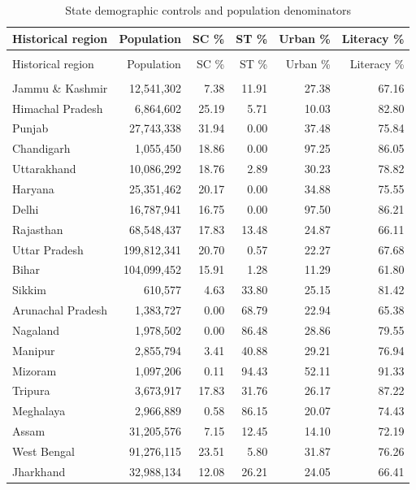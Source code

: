 \documentclass[11pt,a4paper]{report}
\begin{document}
\begin{longtable}{>{\raggedright\arraybackslash}p{5.0cm}rrrrr}
\caption{State demographic controls and population denominators}\\\toprule
Historical region & Population & SC \% & ST \% & Urban \% & Literacy \% \\\midrule\endfirsthead
\multicolumn{6}{l}{\textit{Continued from previous page}}\\\toprule
Historical region & Population & SC \% & ST \% & Urban \% & Literacy \% \\\midrule\endhead
\midrule\multicolumn{6}{r}{\textit{Continued on next page}}\\\endfoot\bottomrule\endlastfoot
Jammu \& Kashmir & 12,541,302 & 7.38 & 11.91 & 27.38 & 67.16 \\
Himachal Pradesh & 6,864,602 & 25.19 & 5.71 & 10.03 & 82.80 \\
Punjab & 27,743,338 & 31.94 & 0.00 & 37.48 & 75.84 \\
Chandigarh & 1,055,450 & 18.86 & 0.00 & 97.25 & 86.05 \\
Uttarakhand & 10,086,292 & 18.76 & 2.89 & 30.23 & 78.82 \\
Haryana & 25,351,462 & 20.17 & 0.00 & 34.88 & 75.55 \\
Delhi & 16,787,941 & 16.75 & 0.00 & 97.50 & 86.21 \\
Rajasthan & 68,548,437 & 17.83 & 13.48 & 24.87 & 66.11 \\
Uttar Pradesh & 199,812,341 & 20.70 & 0.57 & 22.27 & 67.68 \\
Bihar & 104,099,452 & 15.91 & 1.28 & 11.29 & 61.80 \\
Sikkim & 610,577 & 4.63 & 33.80 & 25.15 & 81.42 \\
Arunachal Pradesh & 1,383,727 & 0.00 & 68.79 & 22.94 & 65.38 \\
Nagaland & 1,978,502 & 0.00 & 86.48 & 28.86 & 79.55 \\
Manipur & 2,855,794 & 3.41 & 40.88 & 29.21 & 76.94 \\
Mizoram & 1,097,206 & 0.11 & 94.43 & 52.11 & 91.33 \\
Tripura & 3,673,917 & 17.83 & 31.76 & 26.17 & 87.22 \\
Meghalaya & 2,966,889 & 0.58 & 86.15 & 20.07 & 74.43 \\
Assam & 31,205,576 & 7.15 & 12.45 & 14.10 & 72.19 \\
West Bengal & 91,276,115 & 23.51 & 5.80 & 31.87 & 76.26 \\
Jharkhand & 32,988,134 & 12.08 & 26.21 & 24.05 & 66.41 \\

\end{longtable}
\end{document}
